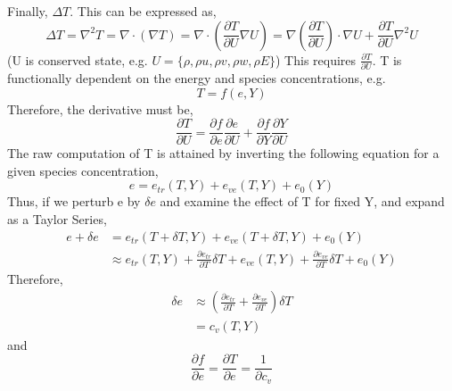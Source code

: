 \documentclass[10pt]{article}
\newcommand{\myred}[1]{{\color{red} #1}}
\begin{document}
Finally, $\Delta{}T$. This can be expressed as, 
\begin{equation}
\Delta T = \nabla^2 T = \nabla \cdot (\nabla T) = \nabla \cdot
 (\frac{\partial T}{\partial U} \nabla U) =  \nabla (\frac{\partial
 T}{\partial U} )\cdot \nabla U + \frac{\partial T}{\partial U} \nabla^2 U  
\end{equation}
(U is conserved state, e.g. $U=\{\rho,\rho u,\rho v, \rho w, \rho E
\}$) This requires $\frac{\partial T}{\partial U}$. T is functionally
dependent on the energy and species concentrations, e.g.
\begin{equation}
 T = f(e,Y)
\end{equation}
Therefore, the derivative must be,
\begin{equation}
 \frac{\partial T}{\partial U} = \frac{\partial f}{\partial
  e}\frac{\partial e}{\partial U} + \frac{\partial f}{\partial
  Y}\frac{\partial Y}{\partial U}
\end{equation}
The raw computation of T is attained by inverting the following equation
for a given species concentration,
\begin{equation}
e = e_{tr}(T,Y) + e_{ve}(T,Y) + e_{0}(Y)
\end{equation}
Thus, if we perturb e by $\delta e$ and examine the effect of T for
fixed Y, and expand as a Taylor Series,
\begin{align}
e + \delta e &= e_{tr}(T + \delta T,Y) + e_{ve}(T+\delta T,Y) + e_{0}(Y) \\
 &\approx e_{tr}(T,Y) + \frac{\partial e_{tr}}{\partial T} \delta T +
 e_{ve}(T,Y)+ \frac{\partial e_{ve}}{\partial T} \delta T + e_{0}(Y)
\end{align}
Therefore, 
\begin{align}
\delta e &\approx \left( \frac{\partial e_{tr}}{\partial T} +
 \frac{\partial e_{ve}}{\partial T} \right) \delta T \\ 
 &= c_v(T,Y)
\end{align}
and
\begin{equation}
 \frac{\partial f}{\partial e} = \frac{\partial T}{\partial e} = \frac{1}{\partial c_v}
\end{equation}
\end{document}
